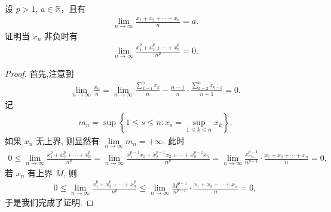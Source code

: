 \documentclass[../../main.tex]{subfiles}%
\begin{document}
\begin{proposition}\label{proposition:p次切萨罗和的性质}
设 $p>1$, $a\in\mathbb{R}$，且有 
\begin{align*}
\lim\limits_{n\to\infty} \frac{x_1+x_2+\cdots+x_n}{n}=a.
\end{align*}
证明当 $x_n$ 非负时有 
\begin{align*}
\lim\limits_{n\to\infty} \frac{x_1^p+x_2^p+\cdots+x_n^p}{n^p}=0.
\end{align*}
\end{proposition}
\begin{proof}
首先,注意到
\begin{align*}
\lim\limits_{n \to \infty} \frac{x_n}{n}
= \lim\limits_{n \to \infty} \frac{\sum\limits_{k=1}^n x_k}{n}
- \frac{n-1}{n} \cdot \frac{\sum\limits_{k=2}^n x_{k-1}}{n-1}
= 0.
\end{align*}
记
\begin{align*}
m_n = \sup \left\{ 1 \leqslant s \leqslant n : x_s = \sup_{1 \leqslant k \leqslant n} x_k \right\}.
\end{align*}
如果 $x_n$ 无上界, 则显然有 $\lim\limits_{n \to \infty} m_n = +\infty$. 此时
\begin{align*}
0\leqslant \lim_{n\rightarrow \infty} \frac{x_{1}^{p}+x_{2}^{p}+\cdots +x_{n}^{p}}{n^p}=\lim_{n\rightarrow \infty} \frac{x_{1}^{p-1}x_1+x_{2}^{p-1}x_2+\cdots +x_{n}^{p-1}x_n}{n^p}=\lim_{n\rightarrow \infty} \frac{x_{m_n}^{p-1}}{n^{p-1}}\cdot \frac{x_1+x_2+\cdots +x_n}{n}=0.
\end{align*}
若 $x_n$ 有上界 $M$, 则
\begin{align*}
0\leqslant \lim_{n\rightarrow \infty} \frac{x_{1}^{p}+x_{2}^{p}+\cdots +x_{n}^{p}}{n^p}\leqslant \lim_{n\rightarrow \infty} \frac{M^{p-1}}{n^{p-1}}\cdot \frac{x_1+x_2+\cdots +x_n}{n}=0,
\end{align*}
于是我们完成了证明.
\end{proof}
\end{document}
